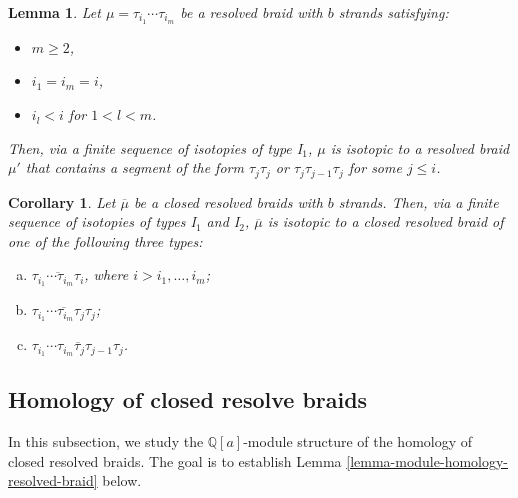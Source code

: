 \documentclass{amsart}
\theoremstyle{plain}
\newtheorem{lemma}[theorem]{Lemma}
\newtheorem{corollary}[theorem]{Corollary}
\theoremstyle{definition}
\theoremstyle{remark}
\numberwithin{equation}{section}
\begin{document}
\begin{lemma}\cite[Lemma 3.5]{Wu5}\label{lemma-resolved-braid-I-1}
Let $\mu=\tau_{i_1}\cdots\tau_{i_m}$ be a resolved braid with $b$ strands satisfying: 
\begin{itemize}
	\item $m\geq2$,
	\item $i_1=i_m=i$,
	\item $i_l<i$ for $1<l<m$.
\end{itemize}
Then, via a finite sequence of isotopies of type I$_1$, $\mu$ is isotopic to a resolved braid $\mu'$ that contains a segment of the form $\tau_j\tau_j$ or $\tau_j\tau_{j-1}\tau_j$ for some $j\leq i$.
\end{lemma}

\begin{corollary}\label{cor-resolved-braid-induction}
Let $\overline{\mu}$ be a closed resolved braids with $b$ strands. Then, via a finite sequence of isotopies of types I$_1$ and I$_2$, $\overline{\mu}$ is isotopic to a closed resolved braid of one of the following three types:
\begin{enumerate}[(a)]
	\item $\overline{\tau_{i_1}\cdots\tau_{i_m}\tau_i}$, where $i>i_1,\dots,i_m$;
	\item $\overline{\tau_{i_1}\cdots\tau_{i_m}\tau_j\tau_j}$;
	\item $\overline{\tau_{i_1}\cdots\tau_{i_m}\tau_j\tau_{j-1}\tau_j}$.
\end{enumerate}
\end{corollary}

\subsection{Homology of closed resolve braids} In this subsection, we study the ${\mathbb{Q}}[a]$-module structure of the homology of closed resolved braids. The goal is to establish Lemma \ref{lemma-module-homology-resolved-braid} below.
\end{document}
